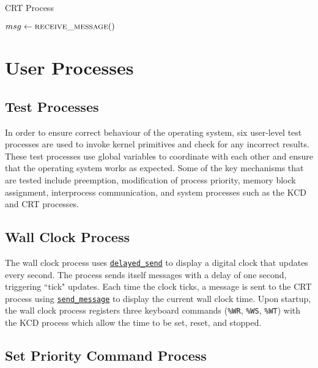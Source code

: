 \documentclass[12pt]{report}
\begin{document}
\begin{algorithm}
\caption{CRT Process}
\label{alg:crtprocess}
\begin{algorithmic}[1]
        \State $msg \leftarrow \Call{receive\_message}{\null}$
            \State {}
        \Else
            \State {}
        \EndIf
    \EndWhile
\EndProcedure
\end{algorithmic}
\end{algorithm}

\section{User Processes}

\subsection{Test Processes}

In order to ensure correct behaviour of the operating system, six user-­level test processes are used to invoke kernel primitives and check for any incorrect results. These test processes use global variables to coordinate with each other and ensure that the operating system works as expected. Some of the key mechanisms that are tested include preemption, modification of process priority, memory block assignment, interprocess communication, and system processes such as the KCD and CRT processes.

\subsection{Wall Clock Process}

The wall clock process uses \hyperref[alg:sendingdelayedmessages]{\texttt{delayed_send}} to display a digital clock that updates every second. The process sends itself messages with a delay of one second,
triggering ``tick" updates. Each time the clock ticks, a message is sent to the CRT process using \hyperref[alg:sendingmessages]{\texttt{send_message}} to display the current wall clock time. Upon startup, the wall clock process registers three keyboard commands (\texttt{\%WR}, \texttt{\%WS}, \texttt{\%WT}) with the KCD process which allow the time to be set, reset, and stopped.

\subsection{Set Priority Command Process}
\end{document}
